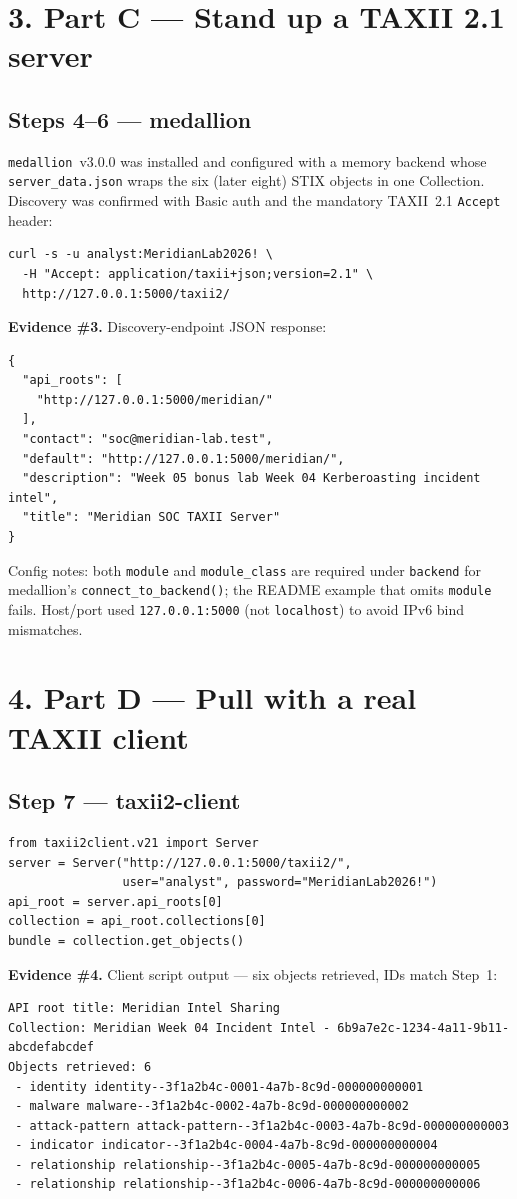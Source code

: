 \documentclass[11pt,letterpaper]{article}
\newcommand{\labpart}[1]{%
  \par\vspace{0.35em}%
  \Needspace{8\baselineskip}%
  \section*{#1}%
  \nopagebreak
}
\newcommand{\labstep}[1]{%
  \Needspace{6\baselineskip}%
  \subsection*{#1}%
  \nopagebreak
}
\newcommand{\evidencebox}[2]{%
  \par\vspace{0.25em}%
  \noindent\colorbox{okbox}{\parbox{\dimexpr\linewidth-2\fboxsep\relax}{%
    \textbf{Evidence \#{#1}.} #2}}%
  \par\vspace{0.25em}%
}
\begin{document}
\labpart{3. Part C --- Stand up a TAXII 2.1 server}

\labstep{Steps 4--6 --- medallion}

\texttt{medallion}~v3.0.0 was installed and configured with a memory backend whose \texttt{server\_data.json} wraps the six (later eight) STIX objects in one Collection. Discovery was confirmed with Basic auth and the mandatory TAXII~2.1 \texttt{Accept} header:

\begin{lstlisting}
curl -s -u analyst:MeridianLab2026! \
  -H "Accept: application/taxii+json;version=2.1" \
  http://127.0.0.1:5000/taxii2/
\end{lstlisting}

\evidencebox{3}{Discovery-endpoint JSON response:}

\begin{lstlisting}
{
  "api_roots": [
    "http://127.0.0.1:5000/meridian/"
  ],
  "contact": "soc@meridian-lab.test",
  "default": "http://127.0.0.1:5000/meridian/",
  "description": "Week 05 bonus lab Week 04 Kerberoasting incident intel",
  "title": "Meridian SOC TAXII Server"
}
\end{lstlisting}

Config notes: both \texttt{module} and \texttt{module\_class} are required under \texttt{backend} for medallion's \texttt{connect\_to\_backend()}; the README example that omits \texttt{module} fails. Host/port used \texttt{127.0.0.1:5000} (not \texttt{localhost}) to avoid IPv6 bind mismatches.

\labpart{4. Part D --- Pull with a real TAXII client}

\labstep{Step 7 --- taxii2-client}

\begin{lstlisting}
from taxii2client.v21 import Server
server = Server("http://127.0.0.1:5000/taxii2/",
                user="analyst", password="MeridianLab2026!")
api_root = server.api_roots[0]
collection = api_root.collections[0]
bundle = collection.get_objects()
\end{lstlisting}

\evidencebox{4}{Client script output --- six objects retrieved, IDs match Step~1:}

\begin{lstlisting}
API root title: Meridian Intel Sharing
Collection: Meridian Week 04 Incident Intel - 6b9a7e2c-1234-4a11-9b11-abcdefabcdef
Objects retrieved: 6
 - identity identity--3f1a2b4c-0001-4a7b-8c9d-000000000001
 - malware malware--3f1a2b4c-0002-4a7b-8c9d-000000000002
 - attack-pattern attack-pattern--3f1a2b4c-0003-4a7b-8c9d-000000000003
 - indicator indicator--3f1a2b4c-0004-4a7b-8c9d-000000000004
 - relationship relationship--3f1a2b4c-0005-4a7b-8c9d-000000000005
 - relationship relationship--3f1a2b4c-0006-4a7b-8c9d-000000000006
\end{lstlisting}
\end{document}
